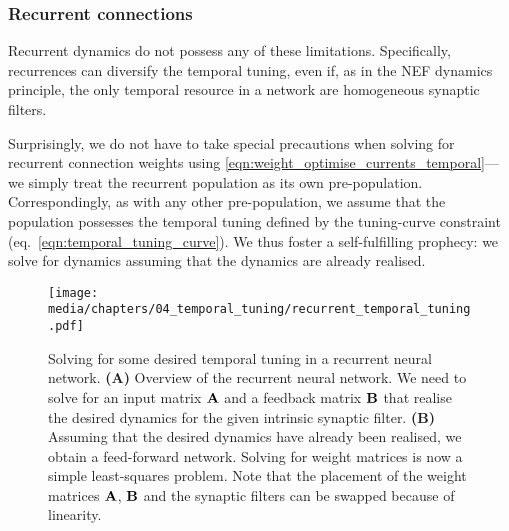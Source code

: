 \subsubsection{Recurrent connections}

Recurrent dynamics do not possess any of these limitations.
Specifically, recurrences can diversify the temporal tuning, even if, as in the NEF dynamics principle, the only temporal resource in a network are homogeneous synaptic filters.

Surprisingly, we do not have to take special precautions when solving for recurrent connection weights using \cref{eqn:weight_optimise_currents_temporal}---we simply treat the recurrent population as its own pre-population.
Correspondingly, as with any other pre-population, we assume that the population possesses the temporal tuning defined by the tuning-curve constraint (eq.~\ref{eqn:temporal_tuning_curve}).
We thus foster a self-fulfilling prophecy: we solve for dynamics assuming that the dynamics are already realised.


\begin{figure}
	\centering
	\texttt{[image: media/chapters/04\_temporal\_tuning/recurrent\_temporal\_tuning.pdf]}
	\caption[Solving for some desired temporal tuning in a recurrent neural network]{Solving for some desired temporal tuning in a recurrent neural network. \textbf{(A)} Overview of the recurrent neural network. We need to solve for an input matrix $\mathbf{A}$ and a feedback matrix $\mathbf{B}$ that realise the desired dynamics for the given intrinsic synaptic filter.
	\textbf{(B)} Assuming that the desired dynamics have already been realised, we obtain a feed-forward network.
	Solving for weight matrices is now a simple least-squares problem.
	Note that the placement of the weight matrices $\mathbf{A}$, $\mathbf{B}$ and the synaptic filters can be swapped because of linearity.
	}
	\label{fig:recurrent_temporal_tuning}
\end{figure}

